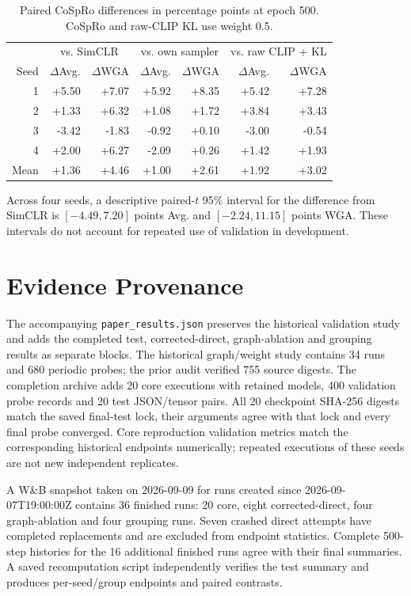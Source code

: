 \documentclass{article}
\begin{document}
\begin{table}[htbp]
\centering\small
\caption{Paired CoSpRo differences in percentage points at epoch 500.
CoSpRo and raw-CLIP KL use weight 0.5.}
\begin{tabular}{rrrrrrr}
\toprule
& \multicolumn{2}{c}{vs. SimCLR} & \multicolumn{2}{c}{vs. own sampler} & \multicolumn{2}{c}{vs. raw CLIP + KL} \\
Seed & $\Delta$Avg. & $\Delta$WGA & $\Delta$Avg. & $\Delta$WGA & $\Delta$Avg. & $\Delta$WGA \\
\midrule
1 & +5.50 & +7.07 & +5.92 & +8.35 & +5.42 & +7.28 \\
2 & +1.33 & +6.32 & +1.08 & +1.72 & +3.84 & +3.43 \\
3 & -3.42 & -1.83 & -0.92 & +0.10 & -3.00 & -0.54 \\
4 & +2.00 & +6.27 & -2.09 & +0.26 & +1.42 & +1.93 \\
\midrule
Mean & +1.36 & +4.46 & +1.00 & +2.61 & +1.92 & +3.02 \\
\bottomrule
\end{tabular}
\end{table}

Across four seeds, a descriptive paired-$t$ 95\% interval for the difference
from SimCLR is $[-4.49,7.20]$ points Avg. and $[-2.24,11.15]$ points WGA.
These intervals do not account for repeated use of validation in development.

\section{Evidence Provenance}
\label{app:provenance}
The accompanying \texttt{paper\_results.json} preserves the historical
validation study and adds the completed test, corrected-direct, graph-ablation
and grouping results as separate blocks. The historical graph/weight study
contains 34 runs and 680 periodic probes; the prior audit verified 755 source
digests. The completion archive adds 20 core executions with retained models,
400 validation probe records and 20 test JSON/tensor pairs. All 20 checkpoint
SHA-256 digests match the saved final-test lock, their arguments agree with
that lock and every final probe converged. Core reproduction validation metrics
match the corresponding historical endpoints numerically; repeated executions
of these seeds are not new independent replicates.

A W\&B snapshot taken on 2026-09-09 for runs created since
2026-09-07T19:00:00Z contains 36 finished runs: 20 core, eight corrected-direct,
four graph-ablation and four grouping runs. Seven crashed direct attempts have
completed replacements and are excluded from endpoint statistics. Complete
500-step histories for the 16 additional finished runs agree with their final
summaries. A saved recomputation script independently verifies the test summary
and produces per-seed/group endpoints and paired contrasts.
\end{document}
